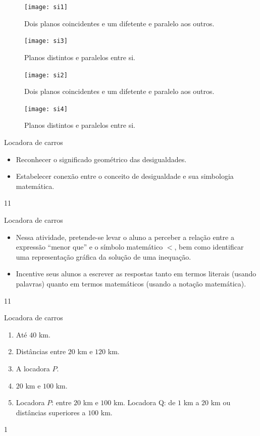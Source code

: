 \begin{enumerate}
\begin{figure}[H]
\begin{minipage}{0.45\linewidth}
\texttt{[image: si1]}
\caption{Dois planos coincidentes e um difetente e paralelo aos outros.}
\end{minipage} \hfill
\begin{minipage}{0.45\linewidth}
\texttt{[image: si3]}
\caption{Planos distintos e paralelos entre si.}
\end{minipage} 
\end{figure}

\begin{figure}[H]
\begin{minipage}{0.45\linewidth}
\texttt{[image: si2]}
\caption{Dois planos coincidentes e um difetente e paralelo aos outros.}
\end{minipage} \hfill
\begin{minipage}{0.45\linewidth}
\texttt{[image: si4]}
\caption{Planos distintos e paralelos entre si.}
\end{minipage} 
\end{figure}

\end{enumerate}


 

\cleardoublepage
\def\currentcolor{session1}
\begin{objectives}{Locadora de carros}
{
\begin{itemize}
\item Reconhecer o significado geométrico das desigualdades.
 \item Estabelecer conexão entre o conceito de desigualdade e sua simbologia matemática.
\end{itemize}
}{1}{1}
\end{objectives}
\begin{sugestions}{Locadora de carros}
{
\begin{itemize}
\item Nessa atividade, pretende-se levar o aluno a perceber a relação entre a expressão “menor que” e o símbolo matemático $<$, bem como identificar uma representação gráfica da solução de uma inequação.
\item Incentive seus alunos a escrever as respostas tanto em termos literais (usando palavras) quanto em termos matemáticos (usando a notação matemática).
\end{itemize}
}{1}{1}
\end{sugestions}
\begin{answer}{Locadora de carros}
{
\begin{enumerate}
\item Até $40$ km.
\item Distâncias entre $20$ km e $120$ km.
\item A locadora $P$.
\item  $20$ km e $100$ km. 
\item Locadora $P$: entre $20$ km e $100$ km.
Locadora Q: de $1$ km a $20$ km ou distâncias superiores a $100$ km.
\end{enumerate}
}{1}
\end{answer}
\label{\detokenize{AF107-6:inequacoes}}\label{\detokenize{AF107-6::doc}}

